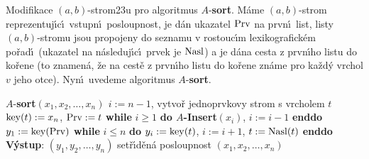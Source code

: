 \flushpar Modifikace $(a,b)$-strom\accent23u pro algoritmus 
$A$-{\bf sort}. M\'ame $(a,b)$-strom reprezentuj\'\i c\'\i\ vstupn\'\i\ 
posloupnost, je d\'an ukazatel $\operatorname{Prv}$ na prvn\'\i\ list, listy 
$(a,b)$-stromu jsou propojeny do seznamu v rostouc\'\i m 
lexikografick\'em po\v rad\'\i\ (ukazatel na n\'asleduj\'\i c\'\i\ prvek je 
$\operatorname{Nasl}$) a je d\'ana cesta z prvn\'\i ho listu do ko\v rene (to 
znamen\'a, \v ze na cest\v e z prvn\'\i ho listu do ko\v rene zn\'ame 
pro ka\v zd\'y vrchol $v$ jeho otce). Nyn\'\i\ uvedeme algoritmus 
$A$-{\bf sort}. 
\bigskip

$A$-{\bf sort$(x_1,x_2,\dots,x_n)$\newline 
$i:=n-1$}, vytvo\v r jednoprvkovy strom s vrcholem $t$\newline 
$\operatorname{key}(t):=x_n$, $\operatorname{Prv}:=t$\newline 
{\bf while} $i\ge 1$ {\bf do $A$-Insert$(x_i)$}, $i:=i-1$ {\bf enddo}\newline 
$y_1:=\operatorname{key}(\operatorname{Prv})$\newline 
{\bf while} $i\le n$ {\bf do\newline 
\phantom{---}$y_i:=\operatorname{key}(t)$}, $i:=i+1$, $t:=\operatorname{Nasl}(t)$\newline 
{\bf enddo\newline 
V\'ystup}: $(y_1,y_2,\dots,y_n)$ set\v r\'\i d\v en\'a posloupnost $
(x_1,x_2,\dots,x_n)$
\medskip


